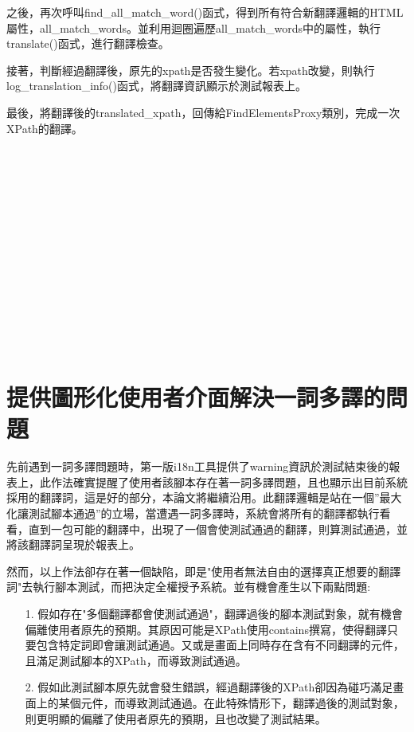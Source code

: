 之後，再次呼叫find\_all\_match\_word()函式，得到所有符合新翻譯邏輯的HTML屬性，all\_match\_words。並利用迴圈遍歷all\_match\_words中的屬性，執行translate()函式，進行翻譯檢查。
	
接著，判斷經過翻譯後，原先的xpath是否發生變化。若xpath改變，則執行log\_translation\_info()函式，將翻譯資訊顯示於測試報表上。

最後，將翻譯後的translated\_xpath，回傳給FindElementsProxy類別，完成一次XPath的翻譯。

\hspace*{\fill} \\
\\ \hspace*{\fill} \\
\\ \hspace*{\fill} \\
\\ \hspace*{\fill} \\
\\ \hspace*{\fill} \\
\\ \hspace*{\fill} \\
\\ \hspace*{\fill} \\
\section{提供圖形化使用者介面解決一詞多譯的問題}
先前遇到一詞多譯問題時，第一版i18n工具提供了warning資訊於測試結束後的報表上，此作法確實提醒了使用者該腳本存在著一詞多譯問題，且也顯示出目前系統採用的翻譯詞，這是好的部分，本論文將繼續沿用。此翻譯邏輯是站在一個”最大化讓測試腳本通過”的立場，當遭遇一詞多譯時，系統會將所有的翻譯都執行看看，直到一包可能的翻譯中，出現了一個會使測試通過的翻譯，則算測試通過，並將該翻譯詞呈現於報表上。

然而，以上作法卻存在著一個缺陷，即是"使用者無法自由的選擇真正想要的翻譯詞"去執行腳本測試，而把決定全權授予系統。並有機會產生以下兩點問題:
\begin{itemize}
\item[1.]假如存在"多個翻譯都會使測試通過"，翻譯過後的腳本測試對象，就有機會偏離使用者原先的預期。其原因可能是XPath使用contains撰寫，使得翻譯只要包含特定詞即會讓測試通過。又或是畫面上同時存在含有不同翻譯的元件，且滿足測試腳本的XPath，而導致測試通過。 
\item[2.]假如此測試腳本原先就會發生錯誤，經過翻譯後的XPath卻因為碰巧滿足畫面上的某個元件，而導致測試通過。在此特殊情形下，翻譯過後的測試對象，則更明顯的偏離了使用者原先的預期，且也改變了測試結果。 
\end{itemize}

